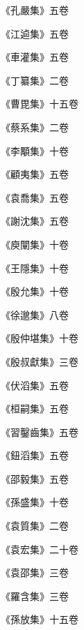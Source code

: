 \begin{pinyinscope}
 《孔嚴集》五卷



 《江逌集》五卷



 《車灌集》五卷



 《丁纂集》二卷



 《曹毘集》十五卷



 《蔡系集》二卷



 《李顒集》十卷



 《顧夷集》五卷



 《袁喬集》五卷



 《謝沈集》五卷



 《庾闡集》十卷



 《王隱集》十卷



 《殷允集》十卷



 《徐邈集》八卷



 《殷仲堪集》十卷



 《殷叔獻集》三卷



 《伏滔集》五卷



 《桓嗣集》五卷



 《習鑿齒集》五卷



 《鈕滔集》五卷



 《邵毅集》五卷



 《孫盛集》十卷



 《袁質集》二卷



 《袁宏集》二十卷



 《袁邵集》三卷



 《羅含集》三卷



 《孫放集》十五卷




\end{pinyinscope}
